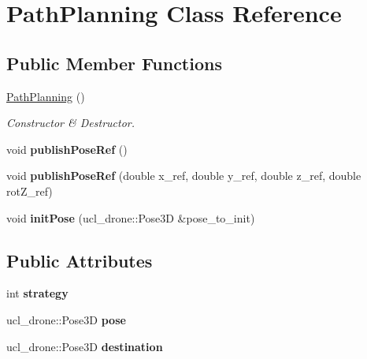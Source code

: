 \hypertarget{classPathPlanning}{}\section{Path\+Planning Class Reference}
\label{classPathPlanning}
\subsection*{Public Member Functions}
\begin{DoxyCompactItemize}
\item 
\mbox{\label{classPathPlanning_a314735f239a01515a3450205dd144619}} 
\hyperlink{classPathPlanning_a314735f239a01515a3450205dd144619}{Path\+Planning} ()
\begin{DoxyCompactList}\small\item\em Constructor \& Destructor. \end{DoxyCompactList}\item 
\mbox{\label{classPathPlanning_a93f2860b8204e00e79f901342e0b9172}} 
void {\bfseries publish\+Pose\+Ref} ()
\item 
\mbox{\label{classPathPlanning_a637e61ee5e62a571afd51a29569652a2}} 
void {\bfseries publish\+Pose\+Ref} (double x\+\_\+ref, double y\+\_\+ref, double z\+\_\+ref, double rot\+Z\+\_\+ref)
\item 
\mbox{\label{classPathPlanning_a9ea15dcfe0f54540ffe5bbed26566f53}} 
void {\bfseries init\+Pose} (ucl\+\_\+drone\+::\+Pose3D \&pose\+\_\+to\+\_\+init)
\end{DoxyCompactItemize}
\subsection*{Public Attributes}
\begin{DoxyCompactItemize}
\item 
\mbox{\label{classPathPlanning_aa07fb09be4b33fe98f3adb1fceb16627}} 
int {\bfseries strategy}
\item 
\mbox{\label{classPathPlanning_ab4a4fce1ae04bd1a9fb9422a931a8f05}} 
ucl\+\_\+drone\+::\+Pose3D {\bfseries pose}
\item 
\mbox{\label{classPathPlanning_a507e4241363364d9bf1d9350a691abdd}} 
ucl\+\_\+drone\+::\+Pose3D {\bfseries destination}
\end{DoxyCompactItemize}

